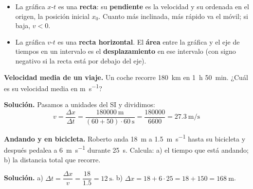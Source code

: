 \begin{itemize}
    \item La gráfica \(x\)-\(t\) es una \textbf{recta}: su \textbf{pendiente} es la velocidad y su ordenada en el origen, la posición
    inicial \(x_0\). Cuanto más inclinada, más rápido va el móvil; si baja, \(v < 0\).
    \item La gráfica \(v\)-\(t\) es una \textbf{recta horizontal}. El \textbf{área} entre la gráfica y el eje de tiempos en un
    intervalo es el \textbf{desplazamiento} en ese intervalo (con signo negativo si la recta está por debajo del eje).
\end{itemize}

\begin{example}
    \textbf{Velocidad media de un viaje.} Un coche recorre \qty{180}{\km} en 1~h 50~min. ¿Cuál es su velocidad media en
    \unit{\m\per\s}?

    \textbf{Solución.} Pasamos a unidades del SI y dividimos:
    \[ v = \frac{\Delta x}{\Delta t} = \frac{\qty{180000}{\m}}{(60 + 50) \cdot \qty{60}{\s}} = \frac{180000}{6600} = \qty{27.3}{\m\per\s} \]
\end{example}

\begin{example}
    \textbf{Andando y en bicicleta.} Roberto anda \qty{18}{\m} a \qty{1.5}{\m\per\s} hasta su bicicleta y después pedalea a
    \qty{6}{\m\per\s} durante \qty{25}{\s}. Calcula: a) el tiempo que está andando; b) la distancia total que recorre.

    \textbf{Solución.} a) \(\Delta t = \dfrac{\Delta x}{v} = \dfrac{18}{\num{1.5}} = \qty{12}{\s}\).
    b) \(\Delta x = 18 + 6 \cdot 25 = 18 + 150 = \qty{168}{\m}\).
\end{example}

